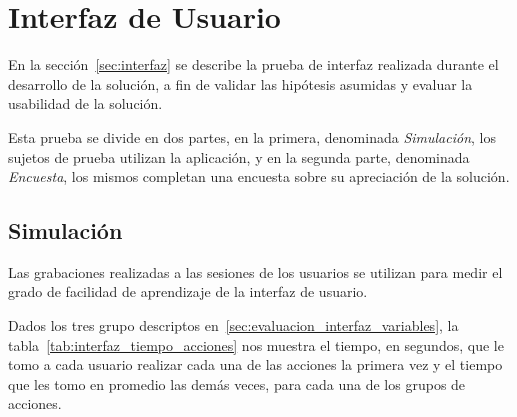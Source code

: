 \section{Interfaz de Usuario}
\label{sec:res_INTERFAZ}


En la sección~\ref{sec:interfaz} se describe la prueba de interfaz realizada
durante el desarrollo de la solución, a fin de validar las hipótesis asumidas y
evaluar la usabilidad de la solución.

Esta prueba se divide en dos partes, en la primera, denominada
\emph{Simulación}, los sujetos de prueba utilizan la aplicación, y en la
segunda parte, denominada \emph{Encuesta}, los mismos completan una encuesta
sobre su apreciación de la solución.

\subsection{Simulación}

Las grabaciones realizadas a las sesiones de los usuarios se utilizan para medir
el grado de facilidad de aprendizaje de la interfaz de usuario.

Dados los tres grupo descriptos en~\ref{sec:evaluacion_interfaz_variables}, la
tabla~\ref{tab:interfaz_tiempo_acciones} nos muestra el tiempo, en segundos,
que le tomo a cada usuario realizar cada una de las acciones la primera vez y
el tiempo que les tomo en promedio las demás veces, para cada una de los grupos
de acciones.

